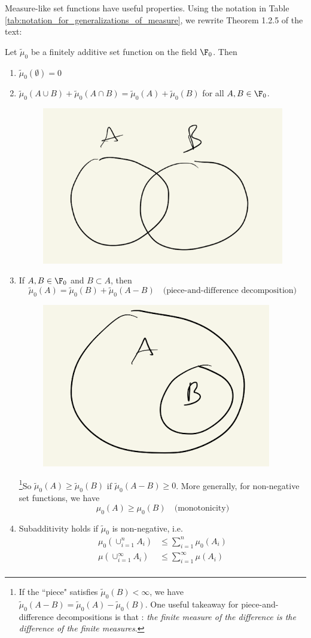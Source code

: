 \documentclass{article} %
\newcommand{\fasf}{\tilde{\mu}_0}
\begin{document}
 
Measure-like set functions have useful properties. Using the notation in Table \ref{tab:notation_for_generalizations_of_measure}, we rewrite Theorem 1.2.5 of the text:
 
 \begin{theorem}
 Let $\fasf$ be a finitely additive set function on the field $\F_0$.  Then
 \begin{enumerate}[label=\alph*)]
 \item \label{itm:first} $\fasf(\emptyset)=0$
 \item \label{itm:second} $\fasf(A \cup B) + \fasf (A \cap B) = \fasf(A) + \fasf(B)$ for all $A,B \in \F_0$.
 \begin{figure}[H]
 \centering
 \includegraphics[width=.2\textwidth]{images/two_overlapping_sets}	
 \end{figure}

 \item \label{itm:piece-and-difference} If $A,B \in \F_0$ and $B \subset A$, then   
  \[ \fasf(A) = \fasf(B) + \fasf(A-B)\quad \text{(piece-and-difference decomposition)} \] 
 \begin{figure}[H]
 \centering
 \includegraphics[width=.2\textwidth]{images/whole_and_piece}	
 \end{figure}
 
 \footnote{If the ``piece" satisfies $\fasf(B) < \infty$, we have $\fasf(A-B) = \fasf(A) - \fasf(B) $.  One useful takeaway for piece-and-difference decompositions is that : \textit{the finite measure of the difference is the difference of the finite measures}.}So $\fasf(A) \geq \fasf(B)$ if $\fasf(A-B) \geq 0$. More generally, for non-negative set functions, we have
 \[ \mu_0 (A) \geq \mu_0 (B) \quad \text{(monotonicity)} \] 
 \item \label{itm:subadditivity} Subadditivity holds if $\fasf$ is non-negative, i.e.
 \begin{align*}
 \mu_0 (\cup_{i=1}^n A_i)& \leq \sum_{i=1}^n \mu_0(A_i) \\
  \mu (\cup_{i=1}^\infty A_i)& \leq \sum_{i=1}^\infty \mu(A_i) \\
 \end{align*}
 \end{enumerate}
\label{thm:basic_properties_of_finitely_additive_set_functions}
 \end{theorem}
  
\end{document}
